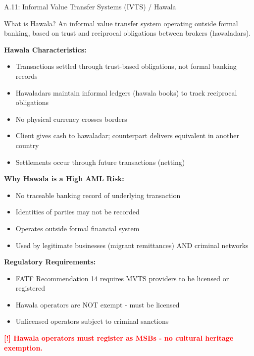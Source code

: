 \documentclass[11pt,a4paper]{beamer}
\newcommand{\redflag}[1]{\textcolor{red}{\textbf{[!] #1}}}
\begin{document}
	\begin{frame}{A.11: Informal Value Transfer Systems (IVTS) / Hawala}
		\begin{block}{What is Hawala?}
			An informal value transfer system operating outside formal banking, based on trust and reciprocal obligations between brokers (hawaladars).
		\end{block}
		\textbf{Hawala Characteristics:}
		\begin{itemize}
			\item Transactions settled through trust-based obligations, not formal banking records
			\item Hawaladars maintain informal ledgers (hawala books) to track reciprocal obligations
			\item No physical currency crosses borders
			\item Client gives cash to hawaladar; counterpart delivers equivalent in another country
			\item Settlements occur through future transactions (netting)
		\end{itemize}
		\textbf{Why Hawala is a High AML Risk:}
		\begin{itemize}
			\item No traceable banking record of underlying transaction
			\item Identities of parties may not be recorded
			\item Operates outside formal financial system
			\item Used by legitimate businesses (migrant remittances) AND criminal networks
		\end{itemize}
		\textbf{Regulatory Requirements:}
		\begin{itemize}
			\item FATF Recommendation 14 requires MVTS providers to be licensed or registered
			\item Hawala operators are NOT exempt - must be licensed
			\item Unlicensed operators subject to criminal sanctions
		\end{itemize}
		\redflag{Hawala operators must register as MSBs - no cultural heritage exemption.}
	\end{frame}
	
\end{document}
